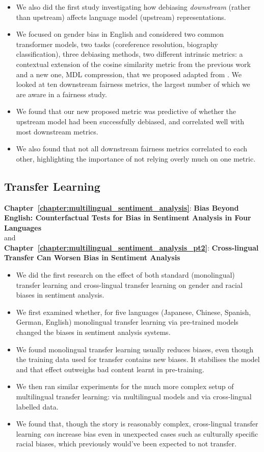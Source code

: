 \begin{itemize}
    \item We also did the first study investigating how debiasing \textit{downstream} (rather than upstream) affects language model (upstream) representations.
    \item We focused on gender bias in English and considered two common transformer models, two tasks (coreference resolution, biography classification), three debiasing methods, two different intrinsic metrics: a contextual extension of the cosine similarity metric from the previous work and a new one, MDL compression, that we proposed adapted from \citet{voita-titov-2020-information}. We looked at ten downstream fairness metrics, the largest number of which we are aware in a fairness study.
    \item We found that our new proposed metric was predictive of whether the upstream model had been successfully debiased, and correlated well with most downstream metrics.
    \item We also found that not all downstream fairness metrics correlated to each other, highlighting the importance of not relying overly much on one metric. 
\end{itemize}


\subsection{Transfer Learning}
\textbf{Chapter~\ref{chapter:multilingual_sentiment_analysis}}: \textbf{Bias Beyond English: Counterfactual Tests for Bias in Sentiment Analysis
in Four Languages} \\
and \\
\textbf{Chapter~\ref{chapter:multilingual_sentiment_analysis_pt2}}: \textbf{Cross-lingual Transfer Can Worsen Bias in Sentiment Analysis}

\begin{itemize}
    \item We did the first research on the effect of both standard (monolingual) transfer learning and cross-lingual transfer learning on gender and racial biases in sentiment analysis.
    \item We first examined whether, for five languages (Japanese, Chinese, Spanish, German, English) monolingual transfer learning via pre-trained models changed the biases in sentiment analysis systems.
    \item  We found monolingual transfer learning usually reduces biases, even though the training data used for transfer contains new biases. It stabilises the model and that effect outweighs bad content learnt in pre-training. 
    \item  We then ran similar experiments for the much more complex setup of multilingual transfer learning: via multilingual models and via cross-lingual labelled data. 
    \item We found that, though the story is reasonably complex, cross-lingual transfer learning \textit{can} increase bias even in unexpected cases such as culturally specific racial biases, which previously would've been expected to not transfer.
\end{itemize}



